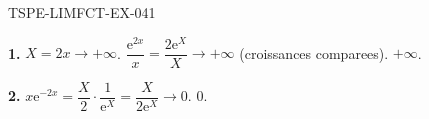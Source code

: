 \begin{corrige}{TSPE-LIMFCT-EX-041}

\textbf{1.} $X = 2x \to +\infty$. $\dfrac{\mathrm{e}^{2x}}{x} = \dfrac{2\mathrm{e}^X}{X} \to +\infty$ (croissances comparees). $\boxed{+\infty}$.

\textbf{2.} $x\mathrm{e}^{-2x} = \dfrac{X}{2} \cdot \dfrac{1}{\mathrm{e}^X} = \dfrac{X}{2\mathrm{e}^X} \to 0$. $\boxed{0}$.

\end{corrige}

